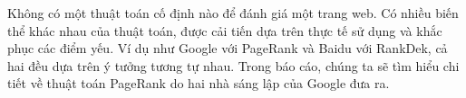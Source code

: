   Không có một thuật toán cố định nào để đánh giá một trang web. Có nhiều biến thể khác nhau của thuật toán, được cải tiến dựa trên thực tế sử dụng và khắc phục các điểm yếu. Ví dụ như Google với PageRank và Baidu với RankDek, cả hai đều dựa trên ý tưởng tương tự nhau. Trong báo cáo, chúng ta sẽ tìm hiểu chi tiết về thuật toán PageRank do hai nhà sáng lập của Google đưa ra.


  
